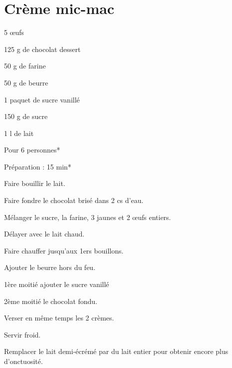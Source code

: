 \section{Crème mic-mac}
\begin{ingredients}
\item 5 œufs
\item 125 g de chocolat dessert
\item 50 g de farine
\item 50 g de beurre
\item 1 paquet de sucre vanillé
\item 150 g de sucre
\item 1 l de lait
\end{ingredients}
\begin{infos}
\item Pour 6 personnes*		%
\item Préparation : 15 min*		%
\end{infos}
\begin{etapes}
\item Faire bouillir le lait.
\item Faire fondre le chocolat brisé dans 2 cs d’eau.
\item Mélanger le sucre, la farine, 3 jaunes et 2 œufs entiers.
\item Délayer avec le lait chaud.
\item Faire chauffer jusqu’aux 1ers bouillons.
\item Ajouter le beurre hors du feu.
\item 1ère moitié ajouter le sucre vanillé
\item 2ème moitié le chocolat fondu.
\item Verser en même temps les 2 crèmes.
\item Servir froid.
\end{etapes}
\begin{conseils}
Remplacer le lait demi-écrémé par du lait entier pour obtenir encore plus d'onctuosité.
\end{conseils}


